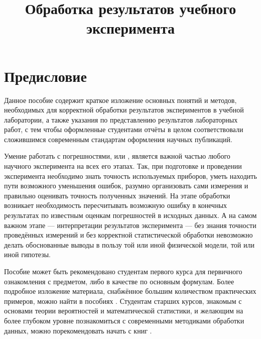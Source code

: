 \documentclass[a5paper,10pt,oneside]{report}
\begin{document}
\title{Обработка результатов учебного эксперимента}


\maketitle
\tableofcontents

\listoftodos

\chapter*{Предисловие}
    Данное пособие содержит краткое изложение основных понятий и методов,
    необходимых для корректной обработки результатов экспериментов в учебной
    лаборатории, а также указания по представлению результатов лабораторных
    работ, с тем чтобы оформленные студентами отчёты в целом соответствовали
    сложившимся современным стандартам оформления научных публикаций.

    Умение работать с погрешностями, или ,
    является важной частью любого научного эксперимента на всех его этапах.
    Так, при подготовке и проведении эксперимента необходимо знать точность
    используемых приборов, уметь находить пути возможного уменьшения ошибок,
    разумно организовать сами измерения и правильно оценивать точность
    полученных значений. На этапе обработки возникает необходимость пересчитывать
    возможную ошибку в конечных результатах по известным оценкам погрешностей
    в исходных данных. А на самом важном этапе --- интерпретации
    результатов эксперимента --- без знания точности проведённых
    измерений и без корректной статистической обработки невозможно делать
    обоснованные выводы в пользу той или иной физической модели, той или
    иной гипотезы.

    Пособие может быть рекомендовано студентам первого курса для первичного
    ознакомления с предметом, либо в качестве 
    по основным формулам. Более подробное изложение материала, снабжённое
    большим количеством практических примеров, можно найти в пособиях
    \cite{taylor,squires,zaidel}. Студентам старших курсов, знакомым
    с основами теории вероятностей и математической статистики, и желающим
    на более глубоком уровне познакомиться с современными методиками обработки
    данных, можно порекомендовать начать с книг \cite{hudson,idie}.






\end{document}
